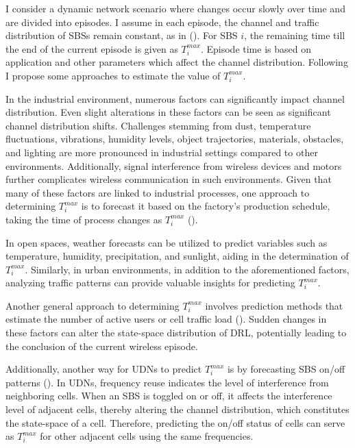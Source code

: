 \documentclass[letterpaper%
, twoside%
, 12pt%
,memoire%
, english%
,creativecommons,hyperref, withAlgo2e %
]{thETS}
\numberwithin{algorithm}{chapter}
\begin{document}
  
  I consider a dynamic network scenario where changes occur slowly over time and are divided into episodes. I assume in each episode, the channel and traffic distribution of SBSs remain constant, as in (\cite{sun2022learning}). For SBS $i$, the remaining time till the end of the current episode is given as $T_i^{max}$. Episode time is based on application and other parameters which affect the channel distribution. Following I propose some approaches to estimate the value of $T_i^{max}$.


In the industrial environment, numerous factors can significantly impact channel distribution. Even slight alterations in these factors can be seen as significant channel distribution shifts. Challenges stemming from dust, temperature fluctuations, vibrations, humidity levels, object trajectories, materials, obstacles, and lighting are more pronounced in industrial settings compared to other environments. Additionally, signal interference from wireless devices and motors further complicates wireless communication in such environments. Given that many of these factors are linked to industrial processes, one approach to determining $T_i^{max}$ is to forecast it based on the factory's production schedule, taking the time of process changes as $T_i^{max}$ (\cite{li2017review}).

  In open spaces, weather forecasts can be utilized to predict variables such as temperature, humidity, precipitation, and sunlight, aiding in the determination of $T_i^{max}$. Similarly, in urban environments, in addition to the aforementioned factors, analyzing traffic patterns can provide valuable insights for predicting $T_i^{max}$.


Another general approach to determining $T_i^{max}$ involves prediction methods that estimate the number of active users or cell traffic load (\cite{wang2022spatial}). Sudden changes in these factors can alter the state-space distribution of DRL, potentially leading to the conclusion of the current wireless episode.

 Additionally, another way for UDNs to predict $T_i^{max}$ is by forecasting SBS on/off patterns (\cite{zhu2021joint}). In UDNs, frequency reuse indicates the level of interference from neighboring cells. When an SBS is toggled on or off, it affects the interference level of adjacent cells, thereby altering the channel distribution, which constitutes the state-space of a cell. Therefore, predicting the on/off status of cells can serve as $T_i^{max}$ for other adjacent cells using the same frequencies.
\end{document}

